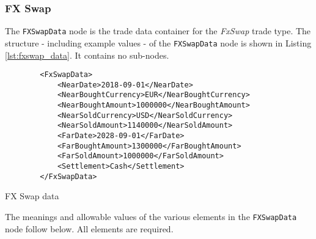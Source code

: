 \subsubsection{FX Swap}

\ifdefined{}\fi

The \lstinline!FXSwapData!  node is the trade data container for the \emph{FxSwap} trade type.  The structure -
including example values - of the \lstinline!FXSwapData!  node is shown in Listing 
\ref{lst:fxswap_data}. 
It contains no sub-nodes.

\begin{listing}[H]
\begin{verbatim}
        <FxSwapData>
            <NearDate>2018-09-01</NearDate>
            <NearBoughtCurrency>EUR</NearBoughtCurrency>
            <NearBoughtAmount>1000000</NearBoughtAmount>
            <NearSoldCurrency>USD</NearSoldCurrency>
            <NearSoldAmount>1140000</NearSoldAmount>
            <FarDate>2028-09-01</FarDate>
            <FarBoughtAmount>1300000</FarBoughtAmount>
            <FarSoldAmount>1000000</FarSoldAmount>
            <Settlement>Cash</Settlement>
        </FxSwapData>
\end{verbatim}
\caption{FX Swap data}
\label{lst:fxswap_data}
\end{listing}

The meanings and allowable values of the various elements in the \lstinline!FXSwapData!  node follow below.  All elements are required.

